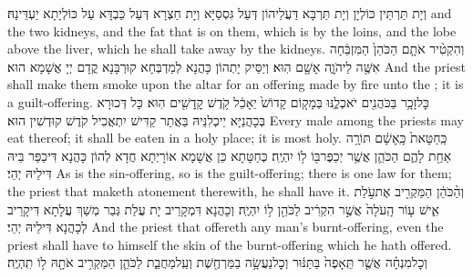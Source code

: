 {וְיָת תַּרְתֵּין כּוֹלְיָן וְיָת תַּרְבָּא דַּעֲלֵיהוֹן דְּעַל גִּסְסַיָּא וְיָת חַצְרָא דְּעַל כַּבְדָּא עַל כּוֹלְיָתָא יַעְדֵּינַהּ׃}
{and the two kidneys, and the fat that is on them, which is by the loins, and the lobe above the liver, which he shall take away by the kidneys.}{}
{וְהִקְטִ֨יר אֹתָ֤ם הַכֹּהֵן֙ הַמִּזְבֵּ֔חָה אִשֶּׁ֖ה לַיהֹוָ֑ה אָשָׁ֖ם הֽוּא׃}
{וְיַסֵּיק יָתְהוֹן כָּהֲנָא לְמַדְבְּחָא קוּרְבָּנָא קֳדָם יְיָ אֲשָׁמָא הוּא׃}
{And the priest shall make them smoke upon the altar for an offering made by fire unto the \lord; it is a guilt-offering.}{}
{כׇּל\maqqaf זָכָ֥ר בַּכֹּהֲנִ֖ים יֹאכְלֶ֑נּוּ בְּמָק֤וֹם קָדוֹשׁ֙ יֵאָכֵ֔ל קֹ֥דֶשׁ קׇֽדָשִׁ֖ים הֽוּא׃}
{כָּל דְּכוּרָא בְּכָהֲנַיָּא יֵיכְלִנֵּיהּ בַּאֲתַר קַדִּישׁ יִתְאֲכִיל קֹדֶשׁ קוּדְשִׁין הוּא׃}
{Every male among the priests may eat thereof; it shall be eaten in a holy place; it is most holy.}{}
{כַּֽחַטָּאת֙ כָּֽאָשָׁ֔ם תּוֹרָ֥ה אַחַ֖ת לָהֶ֑ם הַכֹּהֵ֛ן אֲשֶׁ֥ר יְכַפֶּר\maqqaf בּ֖וֹ ל֥וֹ יִהְיֶֽה׃}
{כְּחַטָּתָא כֵּן אֲשָׁמָא אוֹרָיְתָא חֲדָא לְהוֹן כָּהֲנָא דִּיכַפַּר בֵּיהּ דִּילֵיהּ יְהֵי׃}
{As is the sin-offering, so is the guilt-offering; there is one law for them; the priest that maketh atonement therewith, he shall have it.}{}
{וְהַ֨כֹּהֵ֔ן הַמַּקְרִ֖יב אֶת\maqqaf עֹ֣לַת אִ֑ישׁ ע֤וֹר הָֽעֹלָה֙ אֲשֶׁ֣ר הִקְרִ֔יב לַכֹּהֵ֖ן ל֥וֹ יִהְיֶֽה׃}
{וְכָהֲנָא דִּמְקָרֵיב יָת עֲלַת גְּבַר מְשַׁךְ עֲלָתָא דִּיקָרֵיב לְכָהֲנָא דִּילֵיהּ יְהֵי׃}
{And the priest that offereth any man’s burnt-offering, even the priest shall have to himself the skin of the burnt-offering which he hath offered.}{}
{וְכׇל\maqqaf מִנְחָ֗ה אֲשֶׁ֤ר תֵּֽאָפֶה֙ בַּתַּנּ֔וּר וְכׇל\maqqaf נַעֲשָׂ֥ה בַמַּרְחֶ֖שֶׁת וְעַֽל\maqqaf מַחֲבַ֑ת לַכֹּהֵ֛ן הַמַּקְרִ֥יב אֹתָ֖הּ ל֥וֹ תִֽהְיֶֽה׃}

